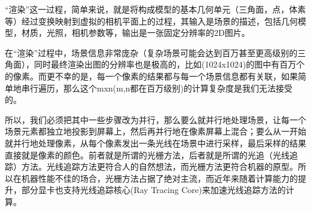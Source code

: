 “渲染”这一过程，简单来说，就是将构成模型的基本几何单元（三角面，点，体素等）经过变换映射到虚拟的相机平面上的过程，其输入是场景的描述，包括几何模型，材质，光照，相机参数等，输出是一张固定分辨率的2D图片。

在“渲染”过程中，场景信息非常庞杂（复杂场景可能会达到百万甚至更高级别的三角面），同时最终渲染出图的分辨率也是极高的，比如(1024x1024)的图中有百万个的像素。而更不幸的是，每一个像素的结果都与每一个场景信息都有关联，如果简单地串行遍历，那么这个mxn(m,n都在百万级别)的计算复杂度是我们无法接受的。

所以，我们必须把其中一些步骤改为并行，那么要么就并行地处理场景，让每一个场景元素都独立地投影到屏幕上，然后再并行地在像素屏幕上混合；要么从一开始就并行地处理像素，从每个像素发出一条光线在场景中进行采样，最后采样的结果直接就是像素的颜色。前者就是所谓的光栅方法，后者就是所谓的光追（光线追踪）方法。光线追踪方法更符合人的自然想法，而光栅方法更符合机器的原型。所以在机器性能不佳的场合，光栅方法占据了绝对主流，而近年来随着计算能力的提升，部分显卡也支持光线追踪核心(Ray Tracing Core)来加速光线追踪方法的计算。
